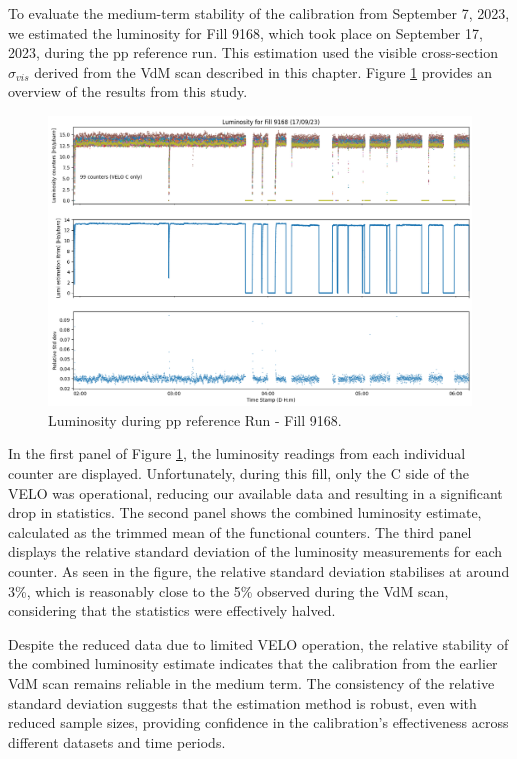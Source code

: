 To evaluate the medium-term stability of the calibration from September 7, 2023, we estimated the luminosity for Fill 9168, which took place on September 17, 2023, during the pp reference run. This estimation used the visible cross-section $\sigma_{vis}$ derived from the VdM scan described in this chapter. Figure \ref{fig:fill9168} provides an overview of the results from this study.
\begin{figure}
    \centering
    \includegraphics[width=\textwidth]{figures/fill9168.png}
    \caption{Luminosity during pp reference Run - Fill 9168.}
    \label{fig:fill9168}
\end{figure}
In the first panel of Figure \ref{fig:fill9168}, the luminosity readings from each individual counter are displayed. Unfortunately, during this fill, only the C side of the VELO was operational, reducing our available data and resulting in a significant drop in statistics. The second panel shows the combined luminosity estimate, calculated as the trimmed mean of the functional counters. The third panel displays the relative standard deviation of the luminosity measurements for each counter. As seen in the figure, the relative standard deviation stabilises at around 3\%, which is reasonably close to the 5\% observed during the VdM scan, considering that the statistics were effectively halved.

Despite the reduced data due to limited VELO operation, the relative stability of the combined luminosity estimate indicates that the calibration from the earlier VdM scan remains reliable in the medium term. The consistency of the relative standard deviation suggests that the estimation method is robust, even with reduced sample sizes, providing confidence in the calibration's effectiveness across different datasets and time periods.

